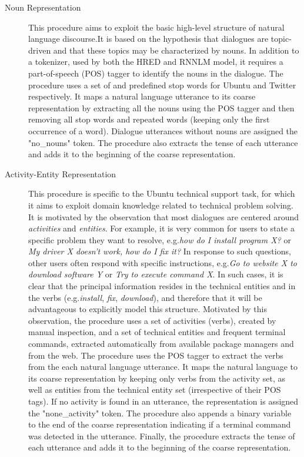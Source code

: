 \documentclass{article}
\begin{document}
\begin{description}
\item [Noun Representation] This procedure aims to exploit the basic high-level structure of natural language discourse.It is based on the hypothesis that dialogues are topic-driven and that these topics may be characterized by nouns.
In addition to a tokenizer, used by both the HRED and RNNLM model, it requires a part-of-speech (POS) tagger to identify the nouns in the dialogue.
The procedure uses a set of  and  predefined stop words for Ubuntu and Twitter respectively.
It maps a natural language utterance to its coarse representation by extracting all the nouns using the POS tagger and then removing all stop words and repeated words (keeping only the first occurrence of a word). Dialogue utterances without nouns are assigned the "no\_nouns" token. The procedure also extracts the tense of each utterance and adds it to the beginning of the coarse representation.
\item [Activity-Entity Representation] This procedure is specific to the Ubuntu technical support task, for which it aims to exploit domain knowledge related to technical problem solving. It is motivated by the observation that most dialogues are centered around \textit{activities} and \textit{entities}. For example, it is very common for users to state a specific problem they want to resolve, e.g.\@ \textit{how do I install program X?} or \textit{My driver X doesn't work, how do I fix it?}
In response to such questions, other users often respond with specific instructions, e.g.\@ \textit{Go to website X to download software Y} or \textit{Try to execute command X}.
In such cases, it is clear that the principal information resides in the technical entities and in the verbs (e.g.\@ \textit{install}, \textit{fix}, \textit{download}), and therefore that it will be advantageous to explicitly model this structure.
Motivated by this observation, the procedure uses a set of  activities (verbs), created by manual inspection, and a set of  technical entities and  frequent terminal commands, extracted automatically from available package managers and from the web.
The procedure uses the POS tagger to extract the verbs from the each natural language utterance.
It maps the natural language to its coarse representation by keeping only verbs from the activity set, as well as entities from the technical entity set (irrespective of their POS tags).
If no activity is found in an utterance, the representation is assigned the "none\_activity" token.
The procedure also appends a binary variable to the end of the coarse representation indicating if a terminal command was detected in the utterance.
Finally, the procedure extracts the tense of each utterance and adds it to the beginning of the coarse representation.
\end{description}
\end{document}
